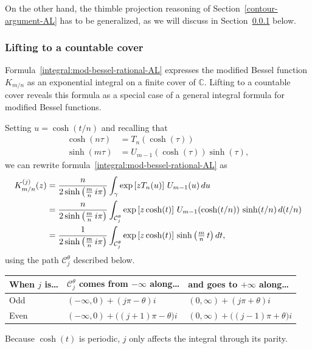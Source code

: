 \documentclass{article}
\newcommand{\C}{\mathbb{C}}
\theoremstyle{definition}
\theoremstyle{plain}
\begin{document}
On the other hand, the thimble projection reasoning of Section~\ref{contour-argument-AL} has to be generalized, as we will discuss in Section~\ref{countable-cover} below.
%
\subsubsection{Lifting to a countable cover}\label{countable-cover}
%
Formula~\eqref{integral:mod-bessel-rational-AL} expresses the modified Bessel function $K_{m/n}$ as an exponential integral on a finite cover of $\C$. Lifting to a countable cover reveals this formula as a special case of a general integral formula for modified Bessel functions.

Setting $u = \cosh(t/n)$ and recalling that
\begin{align*}
\cosh(n\tau) & = T_n(\cosh(\tau)) \\
\sinh(m\tau) & = U_{m-1}(\cosh(\tau)) \sinh(\tau),
\end{align*}
we can rewrite formula~\eqref{integral:mod-bessel-rational-AL} as
\begin{align}
\notag K^{(j)}_{m/n}(z) & = \frac{n}{2 \sinh\big(\tfrac{m}{n}\,i\pi\big)} \int_\gamma \exp\left[z T_n(u)\right]\,U_{m-1}(u)\,du \\
\notag & = \frac{n}{2 \sinh\big(\tfrac{m}{n}\,i\pi\big)} \int_{\mathcal{C}^\theta_j} \exp\left[z \cosh(t)\right]\,U_{m-1}(\cosh(t/n))\,\sinh(t/n)\,d(t/n) \\
\label{integral:mod-bessel-lifted} & = \frac{1}{2 \sinh\big(\tfrac{m}{n}\,i\pi\big)} \int_{\mathcal{C}^\theta_j} \exp\left[z \cosh(t)\right]\,\sinh\big(\tfrac{m}{n}\,t\big)\,dt,
\end{align}
using the path $\mathcal{C}^\theta_j$ described below.
\begin{center}
\begin{tabular}{l|l|l}
When $j$ is\ldots & $\mathcal{C}^\theta_j$ comes from $-\infty$ along\ldots & and goes to $+\infty$ along\ldots \\[1mm] \hline
\vphantom{\rule{0mm}{5mm}} Odd & $(-\infty,0) + (j\pi-\theta)i$ & $(0, \infty) + (j\pi+\theta)i$ \\[1mm] \hline
\vphantom{\rule{0mm}{5mm}} Even & $(-\infty,0) + \big((j+1)\pi-\theta\big)i$ & $(0, \infty) + \big((j-1)\pi+\theta\big)i$ \\[1mm]
\end{tabular}
\end{center}
Because $\cosh(t)$ is periodic, $j$ only affects the integral through its parity.
\end{document}
